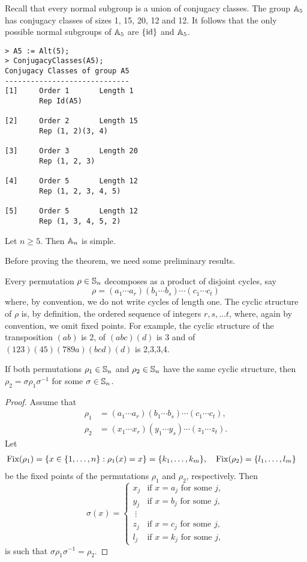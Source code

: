 Recall that every normal subgroup is a union of conjugacy classes. The group 
$\mathbb{A}_5$ has conjugacy classes of sizes 1, 15, 20, 12 and 12. It follows that 
the only possible normal subgroups of $\mathbb{A}_5$ are $\{\operatorname{id}\}$ and $\mathbb{A}_5$. 
\begin{lstlisting}
> A5 := Alt(5);
> ConjugacyClasses(A5);
Conjugacy Classes of group A5
-----------------------------
[1]     Order 1       Length 1
        Rep Id(A5)

[2]     Order 2       Length 15
        Rep (1, 2)(3, 4)

[3]     Order 3       Length 20
        Rep (1, 2, 3)

[4]     Order 5       Length 12
        Rep (1, 2, 3, 4, 5)

[5]     Order 5       Length 12
        Rep (1, 3, 4, 5, 2)
\end{lstlisting}

\begin{theorem}[Jordan]
\label{thm:Jordan}
    Let $n\geq5$. Then $\mathbb{A}_n$ is simple. 
\end{theorem}

Before proving the theorem, we need some preliminary results.

Every permutation $\rho\in\mathbb{S}_n$ decomposes as a product of disjoint cycles, say
\[
\rho=(a_1\cdots a_r)(b_1\cdots b_s)\cdots (c_1\cdots c_t)
\]
where, by convention, we do not write cycles of length one. 
The cyclic structure of $\rho$ is, by definition, the ordered 
sequence of integers $r,s,\dots t$, where, again by convention,  
we omit fixed points. For example, the cyclic structure of 
the transposition $(ab)$ is 2, 
of $(abc)(d)$ is 3 and of $(123)(45)(789a)(bcd)(d)$ is 2,3,3,4. 

\begin{lemma}
If both permutations $\rho_1\in\mathbb{S}_n$ and $\rho_2\in\mathbb{S}_n$ have the same
cyclic structure, then 
$\rho_2=\sigma\rho_1\sigma^{-1}$ for some
$\sigma\in\mathbb{S}_n$. 
\end{lemma}

\begin{proof}
Assume that 
\begin{align*}
\rho_1&=(a_1\cdots a_r)(b_1\cdots b_s)\cdots (c_1\cdots c_t),\\
\rho_2&=(x_1\cdots x_r)(y_1\cdots y_s)\cdots (z_1\cdots z_t).
\end{align*}
Let  
\begin{align*}
\operatorname{Fix}(\rho_1) &= \{x\in\{1,\dots,n\}:\rho_1(x)=x\}=\{k_1,\dots,k_m\},&&
\operatorname{Fix}(\rho_2)=\{l_1,\dots,l_m\}	
\end{align*}
be the fixed points of the permutations $\rho_1$ and $\rho_2$,
respectively. Then 
\[
\sigma(x)=\begin{cases}
x_j & \text{if $x=a_j$ for some $j$},\\
y_j & \text{if $x=b_j$ for some $j$},\\
\;\vdots\\
z_j & \text{if $x=c_j$ for some $j$},\\
l_j & \text{if $x=k_j$ for some $j$},	
\end{cases}
\]
is such that $\sigma\rho_1\sigma^{-1}=\rho_2$. 
\end{proof}

